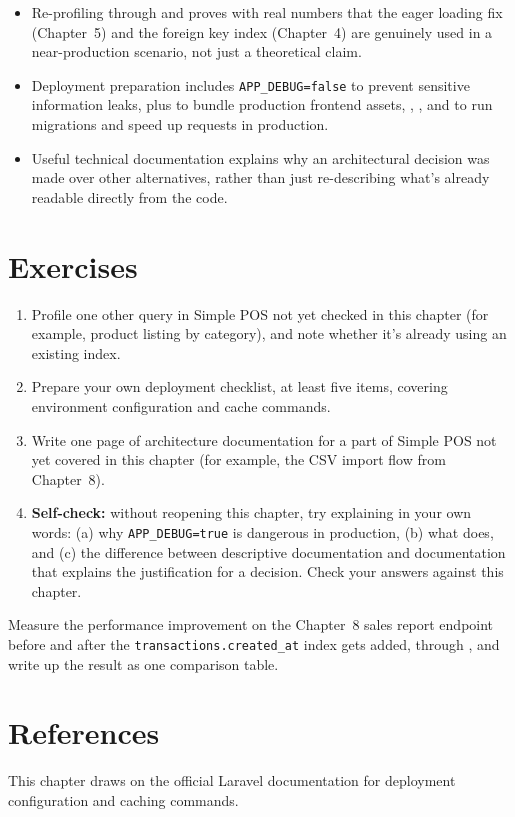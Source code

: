 \begin{itemize}
  \item Re-profiling through  and
     proves with real numbers that the eager
    loading fix (Chapter~5) and the foreign key index (Chapter~4) are
    genuinely used in a near-production scenario, not just a
    theoretical claim.
  \item Deployment preparation includes \texttt{APP\_DEBUG=false} to
    prevent sensitive information leaks, plus  to
    bundle production frontend assets, ,
    , and  to run
    migrations and speed up requests in production.
  \item Useful technical documentation explains why an architectural
    decision was made over other alternatives, rather than just
    re-describing what's already readable directly from the code.
\end{itemize}

\section{Exercises}

\begin{enumerate}
  \item Profile one other query in Simple POS not yet checked in this
    chapter (for example, product listing by category), and note
    whether it's already using an existing index.
  \item Prepare your own deployment checklist, at least five items,
    covering environment configuration and cache commands.
  \item Write one page of architecture documentation for a part of
    Simple POS not yet covered in this chapter (for example, the CSV
    import flow from Chapter~8).
  \item \textbf{Self-check:} without reopening this chapter, try
    explaining in your own words: (a) why \texttt{APP\_DEBUG=true} is
    dangerous in production, (b) what  does, and
    (c) the difference between descriptive documentation and
    documentation that explains the justification for a decision.
    Check your answers against this chapter.
\end{enumerate}

\begin{challengebox}
Measure the performance improvement on the Chapter~8 sales report
endpoint before and after the \texttt{transactions.created\_at} index
gets added, through , and write up the result
as one comparison table.
\end{challengebox}

\section{References}

This chapter draws on the official Laravel documentation
\cite{laraveldocs} for deployment configuration and caching commands.
